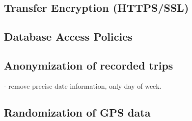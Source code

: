 \subsection{Transfer Encryption (HTTPS/SSL)}
\subsection{Database Access Policies}

\subsection{Anonymization of recorded trips}
- remove precise date information, only day of week.

\subsection{Randomization of GPS data}
